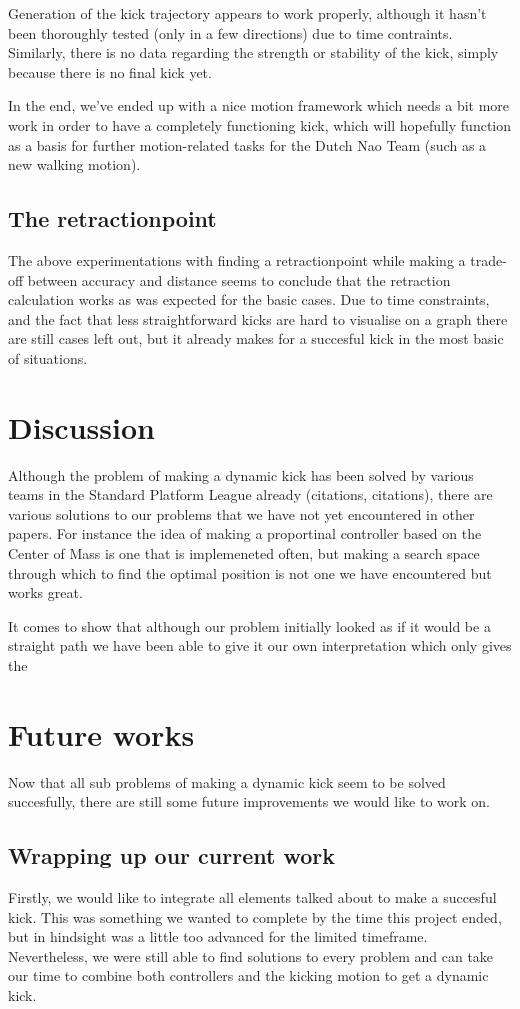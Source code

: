 \documentclass[a4paper]{article}
\begin{document}
Generation of the kick trajectory appears to work properly, although it hasn't
been thoroughly tested (only in a few directions) due to time
contraints. Similarly, there is no data regarding the strength or stability of
the kick, simply because there is no final kick yet.

In the end, we've ended up with a nice motion framework which needs a bit more
work in order to have a completely functioning kick, which will hopefully function
as a basis for further motion-related tasks for the Dutch Nao Team (such as a
new walking motion).

\subsection{The retractionpoint} 
The above experimentations  with finding a retractionpoint while making a
trade-off between accuracy and distance seems to conclude that the retraction calculation
works as was expected for the basic cases. Due to time constraints, and the fact
that less straightforward kicks are hard to visualise on a graph there are still
cases left out, but it already makes for a succesful kick in the most basic of
situations.

\section{Discussion}
Although the problem of making a dynamic kick has been solved by various teams
in the Standard Platform League already (citations, citations), there are various solutions to our
problems that we have not yet encountered in other papers. For instance the idea
of making a proportinal controller based on the Center of Mass is one that is
implemeneted often, but making a search space through which to find the optimal
position is not one we have encountered but works great.

It comes to show that although our problem initially looked as if it would be a
straight path we have been able to give it our own interpretation which only
gives the 

\section{Future works}
Now that all sub problems of making a dynamic kick seem to be solved succesfully, there are still some future improvements we would like to work on.

\subsection{Wrapping up our current work}
Firstly, we would like to integrate all elements talked about to make a succesful kick. This
was something we wanted to complete by the time this project ended, but in
hindsight was a little too advanced for the limited
timeframe. Nevertheless, we were still  able to find
solutions to every problem and can take our time to combine both controllers
and the kicking motion to get a dynamic kick.
\end{document}
